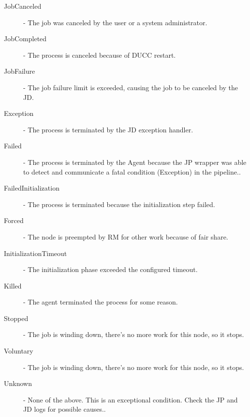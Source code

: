 \begin{description}
\begin{description}
                \item[JobCanceled] - The job was canceled by the user or a system administrator. 
                  
                \item[JobCompleted] - The process is canceled because of DUCC restart. 
                  
                \item[JobFailure] - The job failure limit is exceeded, causing the job to be canceled by the JD. 
                  
                \item[Exception] - The process is terminated by the JD exception handler. 
                  
                \item[Failed] - The process is terminated by the Agent because the JP wrapper was able to detect and 
                  communicate a fatal condition (Exception) in the pipeline.. 
                  
                \item[FailedInitialization] - The process is terminated because the initialization step failed. 
                  
                \item[Forced] - The node is preempted by RM for other work because of fair share. 
                  
                \item[InitializationTimeout] - The initialization phase exceeded the configured timeout. 
                  
                \item[Killed] - The agent terminated the process for some reason. 
                  
                \item[Stopped] - The job is winding down, there's no more work for this node, so it stops. 
                  
                \item[Voluntary] - The job is winding down, there's no more work for this node, so it stops. 
                  
                \item[Unknown] - None of the above. This is an exceptional condition. Check the JP and JD logs for 
                  possible causes..                   
            \end{description}


\end{description}
